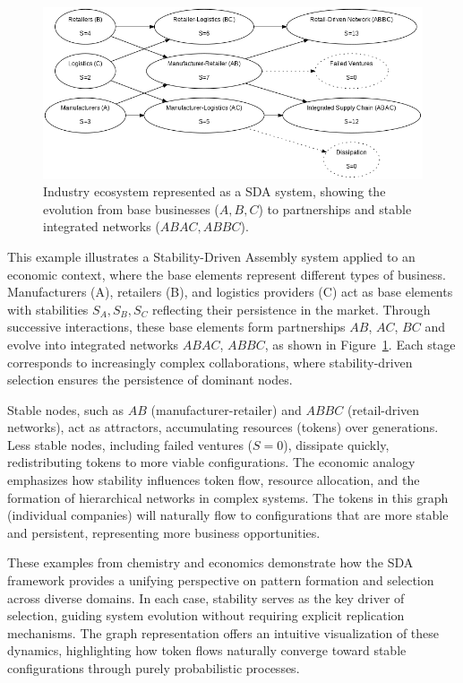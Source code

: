 \documentclass[preprint,12pt]{elsarticle}
\begin{document}
\begin{figure}[h]
    \centering
    \includegraphics[width=1\textwidth]{figure_9.png}
    \caption{Industry ecosystem represented as a SDA system, showing the evolution from base businesses (\( A, B, C \)) to partnerships and stable integrated networks (\( ABAC, ABBC \)).}
    \label{fig:figure_9}
\end{figure}

This example illustrates a Stability-Driven Assembly system applied to an economic context, where the base elements represent different types of business. Manufacturers (A), retailers (B), and logistics providers (C) act as base elements with stabilities \( S_A, S_B, S_C \) reflecting their persistence in the market. Through successive interactions, these base elements form partnerships \( AB \), \( AC \), \( BC \) and evolve into integrated networks \( ABAC \), \( ABBC \), as shown in Figure~\ref{fig:figure_9}. Each stage corresponds to increasingly complex collaborations, where stability-driven selection ensures the persistence of dominant nodes. 

Stable nodes, such as \( AB \) (manufacturer-retailer) and \( ABBC \) (retail-driven networks), act as attractors, accumulating resources (tokens) over generations. Less stable nodes, including failed ventures (\( S=0 \)), dissipate quickly, redistributing tokens to more viable configurations. The economic analogy emphasizes how stability influences token flow, resource allocation, and the formation of hierarchical networks in complex systems. The tokens in this graph (individual companies) will naturally flow to configurations that are more stable and persistent, representing more business opportunities.

These examples from chemistry and economics demonstrate how the SDA framework provides a unifying perspective on pattern formation and selection across diverse domains. In each case, stability serves as the key driver of selection, guiding system evolution without requiring explicit replication mechanisms. The graph representation offers an intuitive visualization of these dynamics, highlighting how token flows naturally converge toward stable configurations through purely probabilistic processes.
\end{document}
